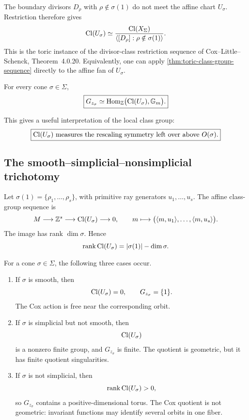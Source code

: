 The boundary divisors \(D_\rho\) with \(\rho\notin\sigma(1)\) do not
meet the affine chart \(U_\sigma\). Restriction therefore gives
\[
\operatorname{Cl}(U_\sigma)
\simeq
\frac{\operatorname{Cl}(X_\Sigma)}
{\left\langle[D_\rho]:\rho\notin\sigma(1)\right\rangle}.
\]
This is the toric instance of the divisor-class restriction sequence
of Cox--Little--Schenck, Theorem~4.0.20. Equivalently, one can apply
\cref{thm:toric-class-group-sequence} directly to the affine fan of
\(U_\sigma\).

\begin{corollary}
\label{cor:local-class-group-cox-stabilizer}
For every cone \(\sigma\in\Sigma\),
\[
\boxed{
G_{z_\sigma}
\simeq
\operatorname{Hom}_{\mathbb{Z}}\bigl(\operatorname{Cl}(U_\sigma),\mathbb{G}_{m}\bigr).
}
\]
\end{corollary}

This gives a useful interpretation of the local class group:
\[
\boxed{
\operatorname{Cl}(U_\sigma)
\text{ measures the rescaling symmetry left over above }O(\sigma).
}
\]

\subsection{The smooth--simplicial--nonsimplicial trichotomy}

Let \(\sigma(1)=\{\rho_1,\dots,\rho_s\}\), with primitive ray
generators \(u_1,\dots,u_s\). The affine class-group sequence is
\[
M
\longrightarrow
\mathbb{Z}^s
\longrightarrow
\operatorname{Cl}(U_\sigma)
\longrightarrow0,
\qquad
m\longmapsto
\bigl(\langle m,u_1\rangle,\dots,
      \langle m,u_s\rangle\bigr).
\]
The image has rank \(\dim\sigma\). Hence
\[
\operatorname{rank}\operatorname{Cl}(U_\sigma)
=
|\sigma(1)|-\dim\sigma.
\]

\begin{theorem}
\label{thm:three-cox-stabilizer-regimes}
For a cone \(\sigma\in\Sigma\), the following three cases occur.

\begin{enumerate}[label=(\arabic*),wide=0pt]
\item If \(\sigma\) is smooth, then
\[
\operatorname{Cl}(U_\sigma)=0,
\qquad
G_{z_\sigma}=\{1\}.
\]
The Cox action is free near the corresponding orbit.

\item If \(\sigma\) is simplicial but not smooth, then
\[
\operatorname{Cl}(U_\sigma)
\]
is a nonzero finite group, and \(G_{z_\sigma}\) is finite. The quotient
is geometric, but it has finite quotient singularities.

\item If \(\sigma\) is not simplicial, then
\[
\operatorname{rank}\operatorname{Cl}(U_\sigma)>0,
\]
so \(G_{z_\sigma}\) contains a positive-dimensional torus. The Cox
quotient is not geometric: invariant functions may identify several
orbits in one fiber.
\end{enumerate}
\end{theorem}

